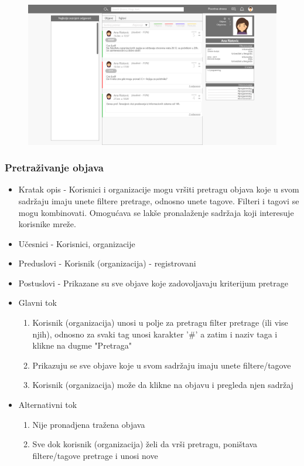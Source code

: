 \begin{figure}[h!]
		\centerline{\includegraphics[width=\textwidth]{slike/pregled_profila.png}}
\end{figure}

\subsubsection{Pretraživanje objava}
\begin{itemize}
	\item Kratak opis - Korisnici i organizacije mogu vršiti pretragu objava koje u svom sadržaju imaju unete filtere pretrage, odnosno unete tagove. Filteri i tagovi se mogu kombinovati. Omogućava se lakše pronalaženje sadržaja koji interesuje korisnike mreže.
	\item Učesnici - Korisnici, organizacije
	\item Preduslovi - Korisnik (organizacija) - registrovani
	\item Postuslovi - Prikazane su sve objave koje zadovoljavaju kriterijum pretrage 
	\item Glavni tok
	\begin{enumerate}
		\item Korisnik (organizacija) unosi u polje za pretragu filter pretrage (ili vise njih), odnosno za svaki tag unosi karakter '\#' a zatim i naziv taga i klikne na dugme "Pretraga"
		\item Prikazuju se sve objave koje u svom sadržaju imaju unete filtere/tagove
		\item Korisnik (organizacija) može da klikne na objavu i pregleda njen sadržaj
	\end{enumerate}
	\item Alternativni tok
	\begin{enumerate}
		\item Nije pronadjena tražena objava
		\item Sve dok korisnik (organizacija) želi da vrši pretragu, poništava filtere/tagove pretrage i unosi nove 
	\end{enumerate}
\end{itemize}

